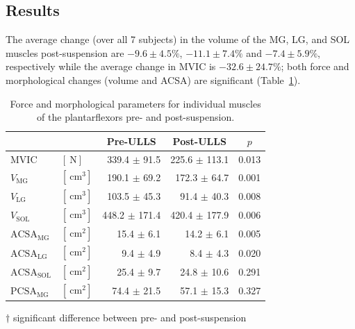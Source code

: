 \subsection{Results}
The average change (over all 7 subjects) in the volume of the MG, LG, and SOL muscles post-suspension are $-9.6 \pm 4.5 \%$, $-11.1 \pm 7.4\%$ and $-7.4 \pm 5.9\%$, respectively while the average change in MVIC is $-32.6 \pm 24.7\%$; both force and morphological changes (volume and ACSA) are significant (Table~\ref{tab: SR1_1}).
\begin{table}[!htb]
\vspace{+0.2cm}
\caption[Force and morphological parameters for individual muscles of the plantarflexors pre- and post-suspension]{Force and morphological parameters for individual muscles of the plantarflexors pre- and post-suspension.}
\label{tab: SR1_1}
\begin{center}
\begin{threeparttable}
\begin{tabular}{@{}llrrc@{}}
\toprule[1pt]\midrule[0.3pt]
            &      & \multicolumn{1}{c}{Pre-ULLS}      & \multicolumn{1}{c}{Post-ULLS}     & $p$ \\ \midrule
MVIC\tnote{$\dagger$} & $\left[\SI{}{\newton}\right]$     			& 339.4 $\pm$ 91.5  & 225.6 $\pm$ 113.1 & 0.013   \\[6pt]
$V_{\mathrm{MG}}$\tnote{$\dagger$} & $\left[\SI{}{\centi\meter^3}\right]$    	& 190.1 $\pm$ 69.2  & 172.3 $\pm$ 64.7  & 0.001   \\[6pt]
$V_{\mathrm{LG}}$\tnote{$\dagger$} & $\left[\SI{}{\centi\meter^3}\right]$    	& 103.5 $\pm$ 45.3  & 91.4 $\pm$ 40.3   & 0.008   \\[6pt]
$V_{\mathrm{SOL}}$\tnote{$\dagger$} & $\left[\SI{}{\centi\meter^3}\right]$   & 448.2 $\pm$ 171.4 & 420.4 $\pm$ 177.9 & 0.006   \\[6pt]
$\mathrm{ACSA}_{\mathrm{MG}}$\tnote{$\dagger$} & $\left[\SI{}{\centi\meter^2}\right]$ & 15.4 $\pm$ 6.1    & 14.2 $\pm$ 6.1    & 0.005   \\[6pt]
$\mathrm{ACSA}_{\mathrm{LG}}$\tnote{$\dagger$} & $\left[\SI{}{\centi\meter^2}\right]$ & 9.4 $\pm$ 4.9     & 8.4 $\pm$ 4.3     & 0.020   \\[6pt]
$\mathrm{ACSA}_{\mathrm{SOL}}$ & $\left[\SI{}{\centi\meter^2}\right]$ 					& 25.4 $\pm$ 9.7    & 24.8 $\pm$ 10.6   & 0.291   \\[4pt]
$\mathrm{PCSA}_{\mathrm{MG}}$ & $\left[\SI{}{\centi\meter^2}\right]$ 					& 74.4 $\pm$ 21.5   & 57.1 $\pm$ 15.3   & 0.327   \\ \midrule[0.3pt]\bottomrule[1pt]
\end{tabular}
\begin{tablenotes}[flushleft]\footnotesize
\item[$\dagger$] significant difference between pre- and post-suspension
\end{tablenotes}
\end{threeparttable}
\end{center}
\vspace{-0.2cm}
\end{table}
